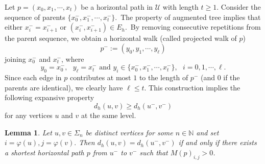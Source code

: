 \documentclass[reqno]{amsart}
\theoremstyle{plain}
\newtheorem{lemma}{Lemma}
\numberwithin{equation}{section}
\begin{document}
Let $p=(x_{0},x_{1},\cdots ,x_{t})$ be a horizontal path in $\mathcal{U}$
with length $t\geq 1$. Consider the sequence of parents $%
\{x_{0}^{-},x_{1}^{-},\cdots ,x_{t}^{-}\}.$\ The property of augmented tree
implies that either $x_{i}^{-}=x_{i+1}^{-}$ or $(x_{i}^{-},x_{i+1}^{-})\in
E_{h}$.\ By removing consecutive repetitions from the parent sequence, we
obtain a horizontal walk (called projected walk of $p$) 
\begin{equation*}
p^{-}:=(y_{0},y_{1},\cdots ,y_{\ell })
\end{equation*}%
joining $x_{0}^{-}$ and $x_{t}^{-}$, where 
\begin{equation*}
y_{0}=x_{0}^{-},\text{ }y_{\ell }=x_{t}^{-}\text{ and }y_{i}\in
\{x_{0}^{-},x_{1}^{-},\cdots ,x_{t}^{-}\},\text{ }i=0,1,\cdots ,\ell .
\end{equation*}%
Since each edge in $p$ contributes at most $1$ to the length of $p^{-}$ (and 
$0$ if the parents are identical), we clearly have $\ell \leq t.$ This
construction implies the following expansive property%
\begin{equation}
d_{h}(u,v)\geq d_{h}(u^{-},v^{-})  \label{expansive}
\end{equation}%
for any vertices $u$ and $v$ at the same level.

\begin{lemma}
\label{le-M}Let $u,v\in \Sigma _{n}$ be distinct vertices for some $n\in 
\mathbb{N}$ and set $i=\varphi (u),j=\varphi (v).$ Then $%
d_{h}(u,v)=d_{h}(u^{-},v^{-})$ if and only if there exists a shortest
horizontal path $p$ from $u^{-}$ to $v^{-}$ such that $M(p)_{i,j}>0$.
\end{lemma}
\end{document}
